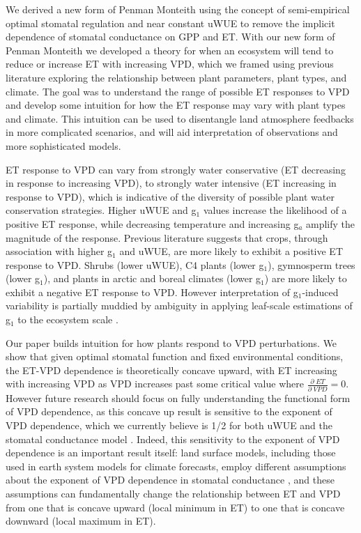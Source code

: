We derived a new form of Penman Monteith using the concept of
semi-empirical optimal stomatal regulation \citep{Lin_2015,
MEDLYN_2011} and near constant uWUE \citep{Zhou_2015} to remove the
implicit dependence of stomatal conductance on GPP and ET. With our
new form of Penman Monteith we developed a theory for when an
ecosystem will tend to reduce or increase ET with increasing VPD,
which we framed using previous literature exploring the relationship
between plant parameters, plant types, and climate. The goal was to
understand the range of possible ET responses to VPD and develop some
intuition for how the ET response may vary with plant types and
climate. This intuition can be used to disentangle land atmosphere
feedbacks in more complicated scenarios, and will aid interpretation
of observations and more sophisticated models.

ET response to VPD can vary from strongly water conservative (ET
decreasing in response to increasing VPD), to strongly water intensive
(ET increasing in response to VPD), which is indicative of the
diversity of possible plant water conservation strategies. Higher uWUE
and g$_1$ values increase the likelihood of a positive ET response,
while decreasing temperature and increasing g$_a$ amplify the
magnitude of the response. Previous literature \citep{Zhou_2015,
Lin_2015} suggests that crops, through association with higher g$_1$
and uWUE, are more likely to exhibit a positive ET response to
VPD. Shrubs (lower uWUE), C4 plants (lower g$_1$), gymnosperm trees
(lower g$_1$), and plants in arctic and boreal climates (lower g$_1$)
are more likely to exhibit a negative ET response to VPD. However
interpretation of g$_1$-induced variability is partially muddied by
ambiguity in applying leaf-scale estimations of g$_1$ to the ecosystem
scale \citep{Medlyn_2017}.

Our paper builds intuition for how plants respond to VPD
perturbations. We show that given optimal stomatal function and fixed
environmental conditions, the ET-VPD dependence is theoretically
concave upward, with ET increasing with increasing VPD as VPD
increases past some critical value where $\frac{\partial \;
ET}{\partial \; VPD} = 0$. However future research should focus on
fully understanding the functional form of VPD dependence, as this
concave up result is sensitive to the exponent of VPD dependence,
which we currently believe is 1/2 for both uWUE and the stomatal
conductance model \citep{MEDLYN_2011, Zhou_2014}. Indeed, this
sensitivity to the exponent of VPD dependence is an important result
itself: land surface models, including those used in earth system
models for climate forecasts, employ different assumptions about the
exponent of VPD dependence in stomatal conductance
\citep[e.g.,][]{Ball_1987, Leuning_1990, MEDLYN_2011}, and these
assumptions can fundamentally change the relationship between ET and
VPD from one that is concave upward (local minimum in ET) to one that
is concave downward (local maximum in ET).

